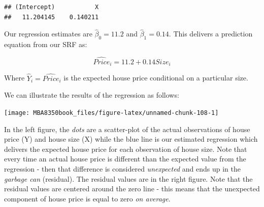 \documentclass[
]{book}
\newenvironment{Shaded}{\begin{snugshade}}{\end{snugshade}}
\newcommand{\AttributeTok}[1]{\textcolor[rgb]{0.77,0.63,0.00}{#1}}
\newcommand{\DecValTok}[1]{\textcolor[rgb]{0.00,0.00,0.81}{#1}}
\newcommand{\FunctionTok}[1]{\textcolor[rgb]{0.00,0.00,0.00}{#1}}
\newcommand{\NormalTok}[1]{#1}
\newcommand{\OtherTok}[1]{\textcolor[rgb]{0.56,0.35,0.01}{#1}}
\newcommand{\SpecialCharTok}[1]{\textcolor[rgb]{0.00,0.00,0.00}{#1}}
\newcommand{\StringTok}[1]{\textcolor[rgb]{0.31,0.60,0.02}{#1}}
\begin{document}
\begin{Shaded}
\end{Shaded}

\begin{verbatim}
## (Intercept)           X 
##   11.204145    0.140211
\end{verbatim}

Our regression estimates are \(\hat{\beta}_0=11.2\) and \(\hat{\beta}_1=0.14\). This delivers a prediction equation from our SRF as:

\[\hat{Price}_i=11.2+0.14Size_i\]

Where \(\hat{Y}_i=\hat{Price}_i\) is the expected house price conditional on a particular size.

We can illustrate the results of the regression as follows:

\begin{Shaded}
\end{Shaded}

\begin{center}\texttt{[image: MBA8350book\_files/figure-latex/unnamed-chunk-108-1]} \end{center}

In the left figure, the \emph{dots} are a scatter-plot of the actual observations of house price (Y) and house size (X) while the blue line is our estimated regression which delivers the expected house price for each observation of house size. Note that every time an actual house price is different than the expected value from the regression - then that difference is considered \emph{unexpected} and ends up in the \emph{garbage can} (residual). The residual values are in the right figure. Note that the residual values are centered around the zero line - this means that the unexpected component of house price is equal to zero \emph{on average}.
\end{document}
